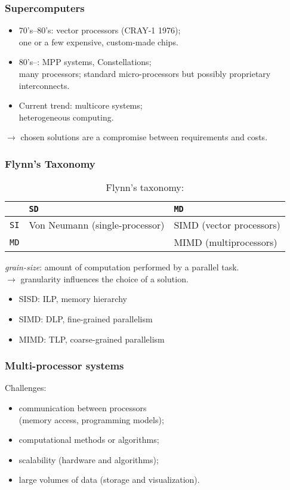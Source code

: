 \begin{frame}
  \frametitle{Supercomputers}
  \begin{itemize}
  \item 70's--80's: vector processors (CRAY-1 1976); \\
    one or a few expensive, custom-made chips.
  \item 80's--: MPP systems, Constellations; \\
    many processors; standard micro-processors but possibly proprietary interconnects.
  \item Current trend: multicore systems; \\
    heterogeneous computing.
  \end{itemize}

$\rightarrow$ chosen solutions are a compromise between requirements and costs.

\end{frame}

\begin{frame}
  \frametitle{Flynn's Taxonomy}
\begin{table}[h!]
\centering
\caption{Flynn's taxonomy:}
\label{tab:doc}
\begin{tabular}{|c|l|l|}
  \hline
  \hfill & \texttt{SD} & \texttt{MD} \\
  \hline
  \texttt{SI} & Von Neumann (single-processor) & SIMD (vector processors) \\
  \texttt{MD} & \hfill                         & MIMD (multiprocessors) \\
  \hline
\end{tabular}
\end{table}
\medskip
\textit{grain-size}: amount of computation performed by a parallel task.\\
$\rightarrow$ granularity influences the choice of a solution.

  \begin{itemize}
  \item SISD: ILP, memory hierarchy
  \item SIMD: DLP, fine-grained parallelism
  \item MIMD: TLP, coarse-grained parallelism
  \end{itemize}

\end{frame}

\begin{frame}
  \frametitle{Multi-processor systems}
  Challenges:
  \begin{itemize}
  \item communication between processors \\
    (memory access, programming models);
  \item computational methods or algorithms;
  \item scalability (hardware and algorithms);
  \item large volumes of data (storage and visualization).
  \end{itemize}
\end{frame}

